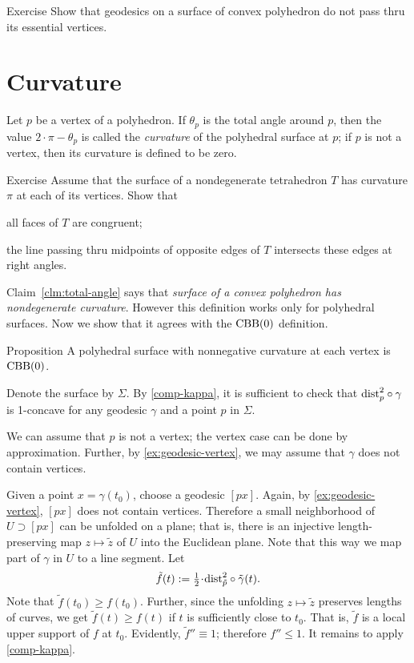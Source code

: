 \begin{thm}{Exercise}\label{ex:geodesic-vertex}
Show that geodesics on a surface of convex polyhedron do not pass thru its essential vertices.
\end{thm}

\section{Curvature}

Let $p$ be a vertex of a polyhedron.
If $\theta_p$ is the total angle around $p$, then the value $2\cdot \pi -\theta_p$ is called the \emph{curvature} of the polyhedral surface at $p$;
if $p$ is not a vertex, then its curvature is defined to be zero.

\begin{thm}{Exercise}\label{pr:tetrahedron} 
Assume that the surface of a nondegenerate tetrahedron $T$ has curvature $\pi$ at each of its vertices.
Show that 

\begin{subthm}{}
all faces of $T$ are congruent; 
\end{subthm}

\begin{subthm}{} the line passing thru midpoints of opposite edges of $T$ intersects these edges at right angles.
\end{subthm}
 
\end{thm}

Claim~\ref{clm:total-angle} says that \textit{surface of a convex polyhedron has nondegenerate curvature}.
However this definition works only for polyhedral surfaces.
Now we show that it agrees with the $\mathrm{CBB}(0)$ definition.

\begin{thm}{Proposition}\label{prop:poly-CBB}
A polyhedral surface with nonnegative curvature at each vertex is $\mathrm{CBB}(0)$.
\end{thm}

Denote the surface by $\Sigma$.
By \ref{comp-kappa}, it is sufficient to check that 
$\mathrm{dist}_p^2\circ\gamma$ is 1-concave for any geodesic $\gamma$ and a point $p$ in $\Sigma$.

We can assume that $p$ is not a vertex;
the vertex case can be done by approximation.
Further, by \ref{ex:geodesic-vertex}, we may assume that $\gamma$ does not contain vertices.

Given a point $x=\gamma(t_0)$, choose a geodesic $[px]$.
Again, by \ref{ex:geodesic-vertex}, $[px]$ does not contain vertices.
Therefore a small neighborhood of $U\supset [px]$ can be unfolded on a plane;
that is, there is an injective length-preserving map $z\mapsto \tilde z$
of $U$ into the Euclidean plane.
Note that this way we map part of $\gamma$ in $U$ to a line segment.
Let 
\[\tilde f(t)\df\tfrac12\cdot\distfun_{\tilde p}^2\circ\tilde \gamma(t).\]
Note that $\tilde f(t_0)\ge f(t_0)$.
Further, since the unfolding $z\mapsto \tilde z$ preserves lengths of curves, we get 
$\tilde f(t)\ge f(t)$ if $t$ is sufficiently close to $t_0$.
That is, $\tilde f$ is a local upper support of $f$ at $t_0$.
Evidently, $\tilde f''\equiv 1$; therefore $f''\le 1$.
It remains to apply \ref{comp-kappa}.
\qeds

